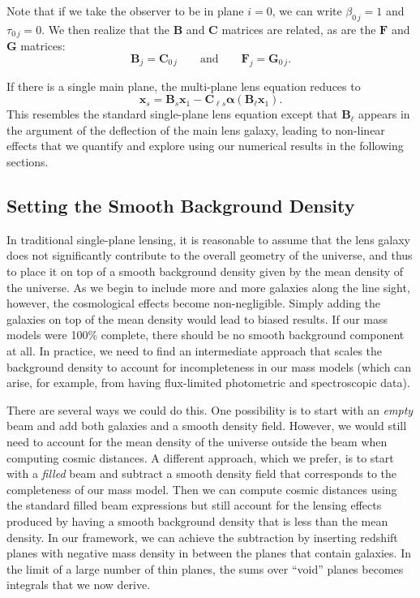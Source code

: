 \documentclass{emulateapj}
\newcommand\B[0]{\mathbf{B}}
\newcommand\C[0]{\mathbf{C}}
\newcommand\F[0]{\mathbf{F}}
\newcommand\G[0]{\mathbf{G}}
\newcommand\x[0]{\mathbf{x}}
\newcommand\al[0]{\boldsymbol{\alpha}}
\begin{document}
Note that if we take the observer to be in plane $i =0$, we can write $\beta_{0\,j} = 1$ and $\tau_{0\,j} = 0$. We then realize that the $\B$ and $\C$ matrices are related, as are the $\F$ and $\G$ matrices:
\begin{equation}\label{eqn:BC-FG}
\B_j = \C_{0 \, j}
\qquad\mbox{and}\qquad
\F_{j} = \G_{0 \, j}.
\end{equation}

If there is a single main plane, the multi-plane lens equation reduces to
\begin{equation}
\x_s = \B_s \x_1 - \C_{\ell s} \al(\B_\ell \x_1).
\end{equation}
This resembles the standard single-plane lens equation except that $\B_\ell$ appears in the argument of the deflection of the main lens galaxy, leading to non-linear effects that we quantify and explore using our numerical results in the following sections.

\subsection{Setting the Smooth Background Density}
\label{sec:Voids}

In traditional single-plane lensing, it is reasonable to assume that the lens galaxy does not significantly contribute to the overall geometry of the universe, and thus to place it on top of a smooth background density given by the mean density of the universe.  As we begin to include more and more galaxies along the line sight, however, the cosmological effects become non-negligible.  Simply adding the galaxies on top of the mean density would lead to biased results.  If our mass models were 100\% complete, there should be no smooth background component at all.  In practice, we need to find an intermediate approach that scales the background density to account for incompleteness in our mass models (which can arise, for example, from having flux-limited photometric and spectroscopic data).

There are several ways we could do this.  One possibility is to start with an \emph{empty} beam and add both galaxies and a smooth density field.  However, we would still need to account for the mean density of the universe outside the beam when computing cosmic distances.  A different approach, which we prefer, is to start with a \emph{filled} beam and subtract a smooth density field that corresponds to the completeness of our mass model.  Then we can compute cosmic distances using the standard filled beam expressions but still account for the lensing effects produced by having a smooth background density that is less than the mean density.  In our framework, we can achieve the subtraction by inserting redshift planes with negative mass density in between the planes that contain galaxies.  In the limit of a large number of thin planes, the sums over ``void'' planes becomes integrals that we now derive.
\end{document}
